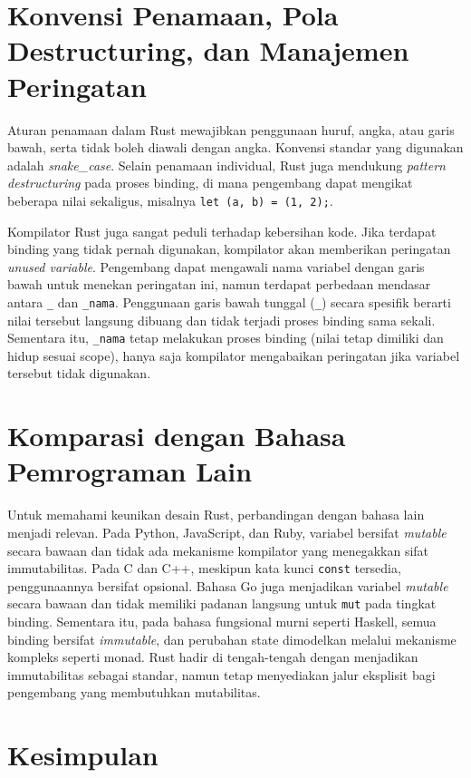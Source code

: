 \documentclass[11pt,a4paper]{article}
\begin{document}
\section{Konvensi Penamaan, Pola Destructuring, dan Manajemen Peringatan}

Aturan penamaan dalam Rust mewajibkan penggunaan huruf, angka, atau garis bawah, serta tidak boleh diawali dengan angka. Konvensi standar yang digunakan adalah \textit{snake\_case}. Selain penamaan individual, Rust juga mendukung \textit{pattern destructuring} pada proses binding, di mana pengembang dapat mengikat beberapa nilai sekaligus, misalnya \texttt{let (a, b) = (1, 2);}.

Kompilator Rust juga sangat peduli terhadap kebersihan kode. Jika terdapat binding yang tidak pernah digunakan, kompilator akan memberikan peringatan \textit{unused variable}. Pengembang dapat mengawali nama variabel dengan garis bawah untuk menekan peringatan ini, namun terdapat perbedaan mendasar antara \texttt{\_} dan \texttt{\_nama}. Penggunaan garis bawah tunggal (\texttt{\_}) secara spesifik berarti nilai tersebut langsung dibuang dan tidak terjadi proses binding sama sekali. Sementara itu, \texttt{\_nama} tetap melakukan proses binding (nilai tetap dimiliki dan hidup sesuai scope), hanya saja kompilator mengabaikan peringatan jika variabel tersebut tidak digunakan.

\section{Komparasi dengan Bahasa Pemrograman Lain}

Untuk memahami keunikan desain Rust, perbandingan dengan bahasa lain menjadi relevan. Pada Python, JavaScript, dan Ruby, variabel bersifat \textit{mutable} secara bawaan dan tidak ada mekanisme kompilator yang menegakkan sifat immutabilitas. Pada C dan C++, meskipun kata kunci \texttt{const} tersedia, penggunaannya bersifat opsional. Bahasa Go juga menjadikan variabel \textit{mutable} secara bawaan dan tidak memiliki padanan langsung untuk \texttt{mut} pada tingkat binding. Sementara itu, pada bahasa fungsional murni seperti Haskell, semua binding bersifat \textit{immutable}, dan perubahan state dimodelkan melalui mekanisme kompleks seperti monad. Rust hadir di tengah-tengah dengan menjadikan immutabilitas sebagai standar, namun tetap menyediakan jalur eksplisit bagi pengembang yang membutuhkan mutabilitas.

\section{Kesimpulan}
\end{document}
